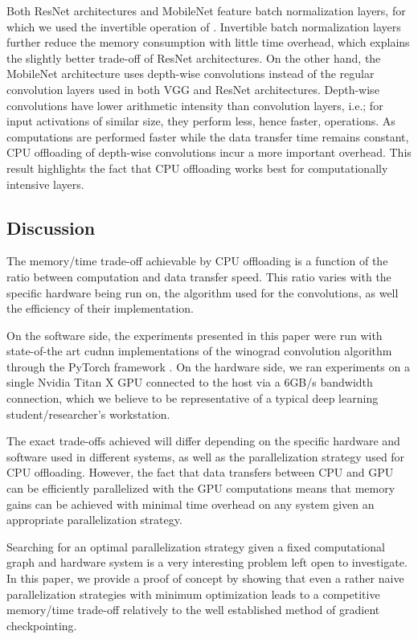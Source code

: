 \documentclass[11pt,onecolumn]{article}
\begin{document}
Both ResNet architectures and MobileNet \cite{howard2017mobilenets} feature batch normalization layers, 
for which we used the invertible operation of \cite{rota2018place}. 
Invertible batch normalization layers further reduce the memory consumption 
with little time overhead, which explains the slightly better trade-off of ResNet architectures.
On the other hand, the MobileNet architecture uses depth-wise convolutions instead of the 
regular convolution layers used in both VGG and ResNet architectures.
Depth-wise convolutions have lower arithmetic intensity \cite{wu2018shift} than convolution layers,
i.e.; for input activations of similar size, they perform less, hence faster, operations. 
As computations are performed faster while the data transfer time remains constant,
CPU offloading of depth-wise convolutions incur a more important overhead.
This result highlights the fact that CPU offloading works best for computationally
intensive layers.

\subsection{Discussion}

The memory/time trade-off achievable by CPU offloading is a function of the ratio 
between computation and data transfer speed. 
This ratio varies with the specific hardware
being run on, the algorithm used for the convolutions, 
as well the efficiency of their implementation.

On the software side, the experiments presented in this paper were run 
with state-of-the art cudnn implementations of the winograd convolution 
algorithm through the PyTorch framework \cite{paszke2017automatic}.
On the hardware side, we ran experiments on a single 
Nvidia Titan X GPU connected to the host via a 6GB/s bandwidth connection, 
which we believe to be representative of a typical deep learning student/researcher's workstation.

The exact trade-offs achieved will differ depending on the specific hardware and software used in 
different systems, as well as the parallelization strategy used for CPU offloading. 
However, the fact that data transfers between CPU and GPU can be efficiently parallelized with the GPU computations
means that memory gains can be achieved with minimal time overhead 
on any system given an appropriate parallelization strategy.  

Searching for an optimal parallelization strategy given a fixed computational graph and hardware system
is a very interesting problem left open to investigate. 
In this paper, we provide a proof of concept by showing that 
even a rather naive parallelization strategies with minimum optimization
leads to a competitive memory/time trade-off relatively to 
the well established method of gradient checkpointing.
\end{document}

